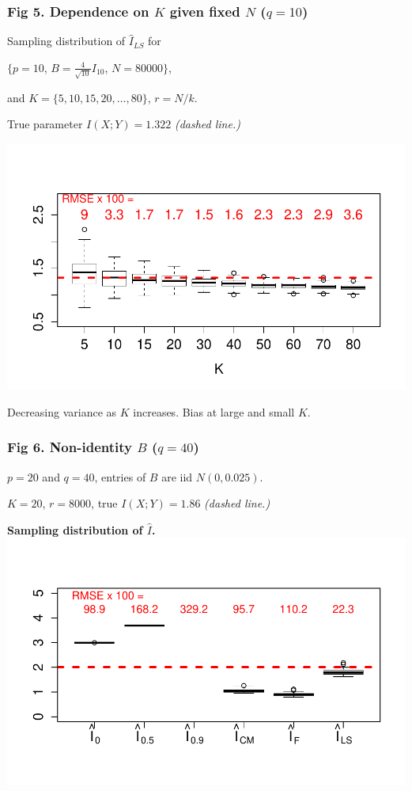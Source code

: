 \documentclass{beamer}
\begin{document}
\begin{frame}
\frametitle{Fig 5. Dependence on $K$ given fixed $N$ ($q = 10$)}
Sampling distribution of $\hat{I}_{LS}$ for \small{$\{p = 10$, $B = \frac{4}{\sqrt{10}} I_{10}$, $N = 80000\}$,

and $K = \{5, 10, 15, 20, \hdots, 80\}$, $r = N/k$.}

True parameter $I(X; Y) = 1.322$ \emph{(dashed line.)}
\begin{center}
\includegraphics[scale = 0.6, clip = true, trim = 0 0.5in 0 0.5in]{../info_theory_sims/fig5a.pdf}
\end{center}

Decreasing variance as $K$ increases. Bias at large and small $K$.
\end{frame}

\begin{frame}
\frametitle{Fig 6. Non-identity $B$ ($q = 40$)}

$p = 20$ and $q = 40$, entries of $B$ are iid $N(0, 0.025)$.

$K=20$, $r = 8000$, true $I(X; Y) = 1.86$ \emph{(dashed line.)}

\begin{center}
\textbf{Sampling distribution of $\hat{I}$.}
\includegraphics[scale = 0.6, clip = true, trim = 0 0.5in 0 0.5in]{../info_theory_sims/fig6.pdf}
\end{center}


\end{frame}
\end{document}
